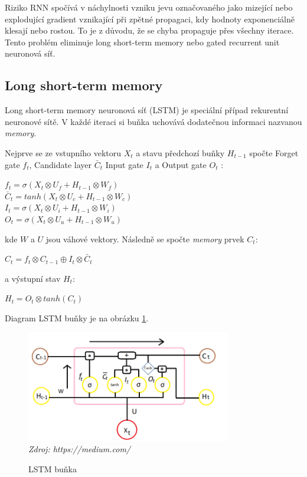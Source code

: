 Riziko RNN spočívá v náchylnosti vzniku jevu označovaného jako mizející nebo explodující gradient vznikající při zpětné propagaci, kdy hodnoty exponenciálně klesají nebo rostou. To je z důvodu, že se chyba propaguje přes všechny iterace. Tento problém eliminuje long short-term memory nebo gated recurrent unit neuronová síť.

\subsection{Long short-term memory}

Long short-term memory neuronová síť (LSTM) je speciální případ rekurentní neuronové sítě. V každé iteraci si buňka uchovává dodatečnou informaci nazvanou \textit{memory}. 

Nejprve se ze vstupního vektoru $X_{t}$ a stavu předchozí buňky $H_{t-1}$ spočte Forget gate $f_{t}$, Candidate layer $\bar{C}_{t}$ Input gate $I_{t}$ a Output gate $O_{t}$ \citep{cho.lstm}:

$f_{t}=\sigma(X_{t} \otimes U_{f}+H_{t-1} \otimes W_{f})$\\\indent
$\bar{C}_{t}=tanh(X_{t} \otimes U_{c}+H_{t-1} \otimes W_{c})$\\\indent
$I_{t}=\sigma(X_{t} \otimes U_{i}+H_{t-1} \otimes W_{i})$\\\indent
$O_{t}=\sigma(X_{t} \otimes U_{u}+H_{t-1} \otimes W_{u})$

\noindent kde $W$ a $U$ jsou váhové vektory. Následně se spočte \textit{memory} prvek $C_{t}$:

$C_{t}=f_{t} \otimes C_{t-1} \oplus I_{t} \otimes \bar{C}_{t}$

\noindent a výstupní stav $H_{t}$:

$H_{t}=O_{t} \otimes tanh(C_{t})$

Diagram LSTM buňky je na obrázku \ref{fig:lstm_cell}.

\begin{figure}[H]
\caption{LSTM buňka}
\label{fig:lstm_cell}
\centering
\includegraphics[width=0.8\textwidth]{img/cho/lstm_cell.png}\\
\textit{Zdroj: https://medium.com/}
\end{figure}

